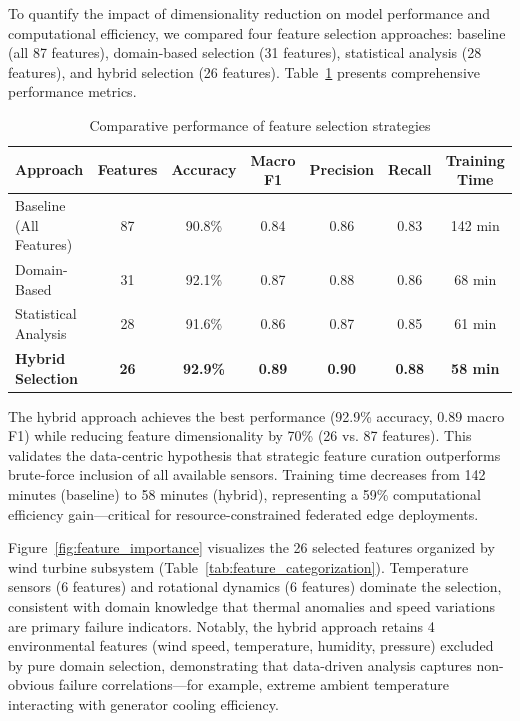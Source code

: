 \documentclass[12pt]{article}
\begin{document}
To quantify the impact of dimensionality reduction on model performance and computational efficiency, we compared four feature selection approaches: baseline (all 87 features), domain-based selection (31 features), statistical analysis (28 features), and hybrid selection (26 features). Table~\ref{tab:feature_selection_results} presents comprehensive performance metrics.

\begin{table}[htbp]
\centering
\caption{Comparative performance of feature selection strategies}
\label{tab:feature_selection_results}
\begin{tabular}{lcccccc}
\toprule
\textbf{Approach} & \textbf{Features} & \textbf{Accuracy} & \textbf{Macro F1} & \textbf{Precision} & \textbf{Recall} & \textbf{Training Time} \\
\midrule
Baseline (All Features) & 87 & 90.8\% & 0.84 & 0.86 & 0.83 & 142 min \\
Domain-Based & 31 & 92.1\% & 0.87 & 0.88 & 0.86 & 68 min \\
Statistical Analysis & 28 & 91.6\% & 0.86 & 0.87 & 0.85 & 61 min \\
\textbf{Hybrid Selection} & \textbf{26} & \textbf{92.9\%} & \textbf{0.89} & \textbf{0.90} & \textbf{0.88} & \textbf{58 min} \\
\bottomrule
\end{tabular}
\end{table}

The hybrid approach achieves the best performance (92.9\% accuracy, 0.89 macro F1) while reducing feature dimensionality by 70\% (26 vs. 87 features). This validates the data-centric hypothesis that strategic feature curation outperforms brute-force inclusion of all available sensors. Training time decreases from 142 minutes (baseline) to 58 minutes (hybrid), representing a 59\% computational efficiency gain—critical for resource-constrained federated edge deployments.

Figure~\ref{fig:feature_importance} visualizes the 26 selected features organized by wind turbine subsystem (Table~\ref{tab:feature_categorization}). Temperature sensors (6 features) and rotational dynamics (6 features) dominate the selection, consistent with domain knowledge that thermal anomalies and speed variations are primary failure indicators. Notably, the hybrid approach retains 4 environmental features (wind speed, temperature, humidity, pressure) excluded by pure domain selection, demonstrating that data-driven analysis captures non-obvious failure correlations—for example, extreme ambient temperature interacting with generator cooling efficiency.
\end{document}
